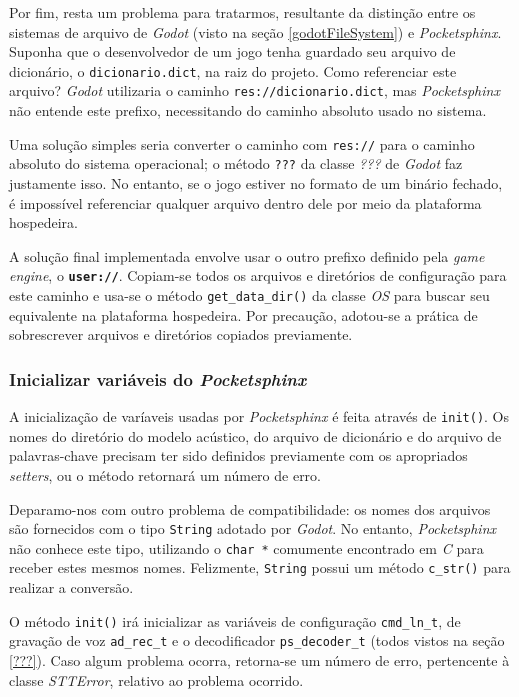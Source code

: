 Por fim, resta um problema para tratarmos, resultante da distinção entre os sistemas de arquivo de \textit{Godot} (visto na seção \ref{godotFileSystem}) e \textit{Pocketsphinx}. Suponha que o desenvolvedor de um jogo tenha guardado seu arquivo de dicionário, o \texttt{dicionario.dict}, na raiz do projeto. Como referenciar este arquivo? \textit{Godot} utilizaria o caminho \texttt{res://dicionario.dict}, mas \textit{Pocketsphinx} não entende este prefixo, necessitando do caminho absoluto usado no sistema.

Uma solução simples seria converter o caminho com \texttt{res://} para o caminho absoluto do sistema operacional; o método \texttt{???} da classe \textit{???} de \textit{Godot} faz justamente isso. No entanto, se o jogo estiver no formato de um binário fechado, é impossível referenciar qualquer arquivo dentro dele por meio da plataforma hospedeira.

A solução final implementada envolve usar o outro prefixo definido pela \textit{game engine}, o \textbf{\texttt{user://}}. Copiam-se todos os arquivos e diretórios de configuração para este caminho e usa-se o método \texttt{get\_data\_dir()} da classe \textit{OS} para buscar seu equivalente na plataforma hospedeira. Por precaução, adotou-se a prática de sobrescrever arquivos e diretórios copiados previamente.

\subsubsection{Inicializar variáveis do \textit{Pocketsphinx}}

A inicialização de varíaveis usadas por \textit{Pocketsphinx} é feita através de \texttt{init()}. Os nomes do diretório do modelo acústico, do arquivo de dicionário e do arquivo de palavras-chave precisam ter sido definidos previamente com os apropriados \textit{setters}, ou o método retornará um número de erro.

Deparamo-nos com outro problema de compatibilidade: os nomes dos arquivos são fornecidos com o tipo \texttt{String} adotado por \textit{Godot}. No entanto, \textit{Pocketsphinx} não conhece este tipo, utilizando o \texttt{char *} comumente encontrado em \textit{C} para receber estes mesmos nomes. Felizmente, \texttt{String} possui um método \texttt{c\_str()} para realizar a conversão.


O método \texttt{init()} irá inicializar as variáveis de configuração \texttt{cmd\_ln\_t}, de gravação de voz \texttt{ad\_rec\_t} e o decodificador \texttt{ps\_decoder\_t} (todos vistos na seção \ref{???}). Caso algum problema ocorra, retorna-se um número de erro, pertencente à classe \mbox{\textit{STTError}}, relativo ao problema ocorrido.

